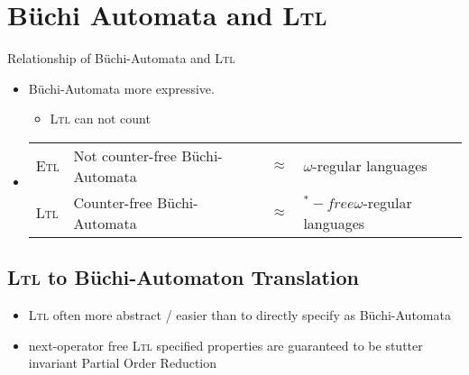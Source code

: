 \documentclass[a4paper, 10pt]{article}
\begin{document}
\section*{Büchi Automata and \textsc{Ltl}}
Relationship of Büchi-Automata and \textsc{Ltl}
\begin{itemize}
    \item Büchi-Automata more expressive.
    \begin{itemize}
        \item \textsc{Ltl} can not count
    \end{itemize}
    \item \begin{tabular}{llcl}
    \textsc{Etl} & Not counter-free Büchi-Automata & $\approx$ & $\omega$-regular languages \\
    \textsc{Ltl} & Counter-free Büchi-Automata & $\approx$ & $^*-free \omega$-regular languages
    \end{tabular}
\end{itemize}
\subsection*{\textsc{Ltl} to Büchi-Automaton Translation}
\begin{itemize}
    \item \textsc{Ltl} often more abstract / easier than to directly specify as Büchi-Automata
    \item next-operator free \textsc{Ltl} specified properties are guaranteed to be stutter invariant \follows Partial Order Reduction
\end{itemize}
\end{document}
